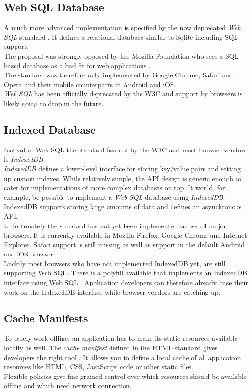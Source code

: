 \subsection{Web SQL Database}
A much more advanced implementation is specified by the now deprecated \emph{Web SQL} standard \cite{websql}. It defines a relational database similar to Sqlite including SQL support.\\
The proposal was strongly opposed by the Mozilla Foundation who sees a SQL-based database as a bad fit for web applications \cite{mozilla_indexeddb}.\\
The standard was therefore only implemented by Google Chrome, Safari and Opera and their mobile counterparts in Android and iOS.\\
\emph{Web SQL} has been officially deprecated by the W3C and support by browsers is likely going to drop in the future.

\subsection{Indexed Database}
Instead of Web SQL the standard favored by the W3C and most browser vendors is \emph{IndexedDB}.\\
\emph{IndexedDB} defines a lower-level interface for storing key/value pairs and setting up custom indexes.
While relatively simple, the API design is generic enough to cater for implementations of more complex databases on top.
It would, for example, be possible to implement a \emph{Web SQL} database using \emph{IndexedDB}.\\
IndexedDB supports storing large amounts of data and defines an asynchronous API.\\
Unfortunately the standard has not yet been implemented across all major browsers.
It is currently available in Mozilla Firefox, Google Chrome and Internet Explorer.
Safari support is still missing as well as support in the default Android and iOS browser.\\
Luckily most browsers who have not implemented IndexedDB yet, are still supporting Web SQL.
There is a polyfill available that implements an IndexedDB interface using Web SQL \cite{indexeddb_polyfill}. Application developers can therefore already base their work on the IndexedDB interface while browser vendors are catching up.

\subsection{Cache Manifests}
To truely work offline, an application has to make its static resources available locally as well.
The \emph{cache manifest} defined in the HTML standard gives developers the right tool \cite{cache_manifests}. It allows you to define a local cache of all application resources like HTML, CSS, JavaScript code or other static files.\\
Flexible policies give fine-grained control over which resources should be available offline and which need network connection.
